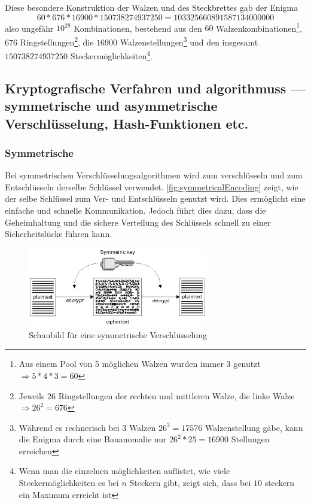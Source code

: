 Diese besondere Konstruktion der Walzen und des Steckbrettes gab der Enigma
\begin{equation}
    60 * 676 * 16900 * 150738274937250 = 103325660891587134000000\label{eq:equation}
\end{equation}
also ungefähr \(10^{28}\) Kombinationen, bestehend aus den \(60\) Walzenkombinationen\footnote{Aus einem Pool von 5 möglichen Walzen wurden immer 3 genutzt $\Rightarrow 5*4*3 = 60$}, \(676\) Ringstellungen\footnote{Jeweils \(26\) Ringstellungen der rechten und mittleren Walze, die linke Walze \(\Rightarrow 26^2 = 676\)}, die \(16900\) Walzenstellungen\footnote{Während es rechnerisch bei 3 Walzen \(26^3 = 17576\) Walzenstellung gäbe, kann die Enigma durch eine Bauanomalie nur \(26^2*25=16900\) Stellungen erreichen}\autocite[]{enigma_double_rotor} und den insgesamt \(150738274937250\) Steckermöglichkeiten\footnote{Wenn man die einzelnen möglichkeiten auflistet, wie viele Steckermöglichkeiten es bei $n$ Steckern gibt, zeigt sich, dass bei $10$ steckern ein Maximum erreicht ist}\autocite[\pagef~810]{anal_eval_enigma}.

\subsection[Kryptografische Verfahren und Algorithmen]{Kryptografische Verfahren und \glspl{algorithmus} — symmetrische und asymmetrische Verschlüsselung, Hash-Funktionen etc.}\label{subsec:Kryptografische-verfahren-und-algorithmen}

\subsubsection[Symmetrische Verschlüsselungsalgorithmen]{Symmetrische }\label{subsubsec:symmetrsiche-algorithmen}
Bei symmetrischen Verschlüsselungsalgorithmen wird zum verschlüsseln und zum Entschlüsseln derselbe Schlüssel verwendet. \autoref{fig:symmetricalEncoding}\autocite{Chapter211:online} zeigt, wie der selbe Schlüssel zum Ver- und Entschlüsseln genutzt wird.
Dies ermöglicht eine einfache und schnelle Kommunikation.
Jedoch führt dies dazu, dass die Geheimhaltung und die sichere Verteilung des Schlüssels schnell zu einer Sicherheitslücke führen kann.

\begin{figure}[htbp]
    \includegraphics[width=0.7\textwidth]{abbildungen/symmetricEncoding}
    \centering
    \caption[
        Schaubild für eine symmetrische Verschlüsselung]{Schaubild für eine symmetrische Verschlüsselung\footnotemark}
    \label{fig:symmetricalEncoding}
\end{figure}


